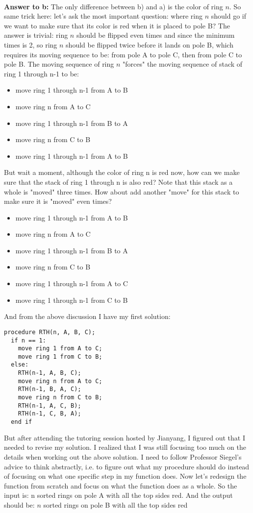 \documentclass[a4paper,11pt]{article}
\theoremstyle{mytheor}
\begin{document}
~\\
\textbf{Answer to b:} The only difference between b) and a) is the color of ring $n$. So same trick here: let's ask the most important question: where ring $n$ should go if we want to make sure that its color is red when it is placed to pole B? The answer is trivial: ring $n$ should be flipped even times and since the minimum times is 2, so ring $n$ should be flipped twice before it lands on pole B, which requires its moving sequence to be: from pole A to pole C, then from pole C to pole B. The moving sequence of ring $n$ "forces" the moving sequence of stack of ring 1 through n-1 to be:
\begin{itemize}
    \item move ring 1 through n-1 from A to B
    \item move ring n from A to C
    \item move ring 1 through n-1 from B to A
    \item move ring n from C to B
    \item move ring 1 through n-1 from A to B
\end{itemize}
But wait a moment, although the color of ring n is red now, how can we make sure that the stack of ring 1 through n is also red? Note that this stack as a whole is "moved" three times. How about add another "move" for this stack to make sure it is "moved" even times?
\begin{itemize}
    \item move ring 1 through n-1 from A to B
    \item move ring n from A to C
    \item move ring 1 through n-1 from B to A
    \item move ring n from C to B
    \item move ring 1 through n-1 from A to C
    \item move ring 1 through n-1 from C to B
\end{itemize}
And from the above discussion I have my first solution:
\begin{lstlisting}[label={list:seventh0},caption=Red Tower of Hanoi procedure.]
procedure RTH(n, A, B, C);
  if n == 1:
    move ring 1 from A to C;
    move ring 1 from C to B;
  else:
    RTH(n-1, A, B, C);
    move ring n from A to C;
    RTH(n-1, B, A, C);
    move ring n from C to B;
    RTH(n-1, A, C, B);
    RTH(n-1, C, B, A);
  end if
\end{lstlisting}
But after attending the tutoring session hosted by Jianyang, I figured out that I needed to revise my solution. I realized that I was still focusing too much on the details when working out the above solution. I need to follow Professor Siegel's advice to think abstractly, i.e. to figure out what my procedure should do instead of focusing on what one specific step in my function does. Now let's redesign the function from scratch and focus on what the function does as a whole. So the input is: n sorted rings on pole A with all the top sides red. And the output should be: $n$ sorted rings on pole B with all the top sides red
\end{document}
